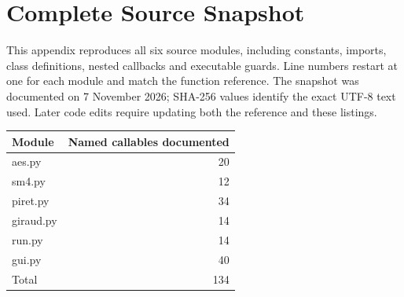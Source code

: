 \appendix
\chapter{Complete Source Snapshot}
\label{app:complete-source}
This appendix reproduces all six source modules, including constants, imports, class definitions, nested callbacks and executable guards. Line numbers restart at one for each module and match the function reference. The snapshot was documented on 7 November 2026; SHA-256 values identify the exact UTF-8 text used. Later code edits require updating both the reference and these listings.
\begin{center}\begin{tabular}{lr}\toprule Module & Named callables documented\\\midrule
aes.py & 20\\
sm4.py & 12\\
piret.py & 34\\
giraud.py & 14\\
run.py & 14\\
gui.py & 40\\
Total & 134\\\bottomrule\end{tabular}\end{center}
